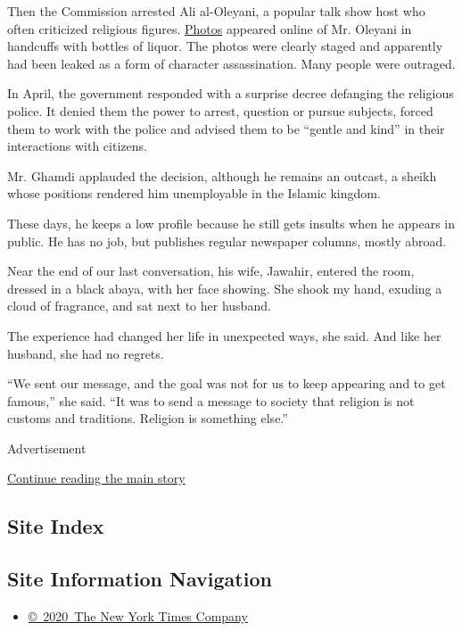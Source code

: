 Then the Commission arrested Ali al-Oleyani, a popular talk show host
who often criticized religious figures.
\href{http://hawl-alkhaleej.sa/8180.html}{Photos} appeared online of Mr.
Oleyani in handcuffs with bottles of liquor. The photos were clearly
staged and apparently had been leaked as a form of character
assassination. Many people were outraged.

In April, the government responded with a surprise decree defanging the
religious police. It denied them the power to arrest, question or pursue
subjects, forced them to work with the police and advised them to be
``gentle and kind'' in their interactions with citizens.

Mr. Ghamdi applauded the decision, although he remains an outcast, a
sheikh whose positions rendered him unemployable in the Islamic kingdom.

These days, he keeps a low profile because he still gets insults when he
appears in public. He has no job, but publishes regular newspaper
columns, mostly abroad.

Near the end of our last conversation, his wife, Jawahir, entered the
room, dressed in a black abaya, with her face showing. She shook my
hand, exuding a cloud of fragrance, and sat next to her husband.

The experience had changed her life in unexpected ways, she said. And
like her husband, she had no regrets.

``We sent our message, and the goal was not for us to keep appearing and
to get famous,'' she said. ``It was to send a message to society that
religion is not customs and traditions. Religion is something else.''

Advertisement

\protect\hyperlink{after-bottom}{Continue reading the main story}

\hypertarget{site-index}{%
\subsection{Site Index}\label{site-index}}

\hypertarget{site-information-navigation}{%
\subsection{Site Information
Navigation}\label{site-information-navigation}}

\begin{itemize}
\tightlist
\item
  \href{https://help.nytimes3xbfgragh.onion/hc/en-us/articles/115014792127-Copyright-notice}{©~2020~The
  New York Times Company}
\end{itemize}

